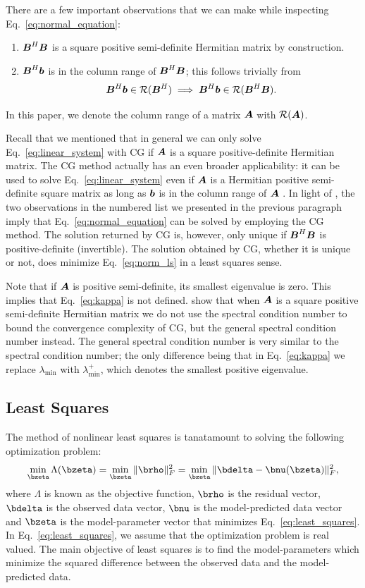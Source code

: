 \documentclass[useAMS,usenatbib]{mn2e}
\newcommand{\bA}{\bmath{A}}
\newcommand{\bB}{\bmath{B}}
\newcommand{\bb}{\bmath{b}}
\begin{document}
There are a few important observations that we can make while inspecting Eq.~\eqref{eq:normal_equation}:
\begin{enumerate}
\item $\bB^H\bB$ is a square positive semi-definite Hermitian matrix by construction.
\item $\bB^H\bb$ is in the column range of $\bB^H\bB$; this follows trivially from 
\begin{equation}
\bB^H\bb \in \mathcal{R}(\bB^H) \implies \bB^H\bb \in \mathcal{R}(\bB^H\bB).   
\end{equation}
\end{enumerate}
In this paper, we denote the column range of a matrix $\bA$ with $\mathcal{R}(\bA)$.

Recall that we mentioned that in general we can only solve Eq.~\eqref{eq:linear_system} with CG if $\bA$ is a square positive-definite Hermitian matrix. The CG method actually has an even broader applicability: it can be used to solve Eq.~\eqref{eq:linear_system} even if $\bA$ is a Hermitian positive semi-definite
square matrix as long as $\bb$ is in the column range of $\bA$ \citep{Lu2015}. In light of \citet{Lu2015}, the two observations in the numbered list we presented in the previous paragraph imply that Eq.~\eqref{eq:normal_equation}
can be solved by employing the CG method. The solution returned by CG is, however, only unique if $\bB^H\bB$ is positive-definite (invertible). The solution
obtained by CG, whether it is unique or not, does minimize Eq.~\eqref{eq:norm_ls} in a least squares sense.

Note that if $\bA$ is positive semi-definite, its smallest eigenvalue is zero. This implies that Eq.~\eqref{eq:kappa} is not defined. \citet{Lu2015} show that when $\bA$
is a square positive semi-definite Hermitian matrix we do not use the spectral condition number to bound the convergence complexity of CG, but the general spectral condition
number instead. The general spectral condition number is very similar to the spectral condition number; the only difference being that in Eq.~\eqref{eq:kappa} we replace  
$\lambda_{\textrm{min}}$ with $\lambda_{\textrm{min}}^+$, which denotes the smallest positive eigenvalue. 

\subsection{Least Squares}
\label{sec:ls}
The method of nonlinear least squares is tanatamount to solving the following optimization problem:  
\begin{equation}
\label{eq:least_squares}
\min_{\bzeta} \Lambda(\bzeta) = \min_{\bzeta} \|\brho\|_F^2 = \min_{\bzeta} \|\bdelta - \bnu(\bzeta)\|_F^2, 
\end{equation}
where $\Lambda$ is known as the objective function, $\brho$ is the residual vector, $\bdelta$ is the observed data vector, $\bnu$ is the model-predicted data vector and $\bzeta$ is the model-parameter vector that minimizes Eq.~\eqref{eq:least_squares}.
In Eq.~\eqref{eq:least_squares}, we assume that the optimization problem is real valued.
The main objective of least squares is to find the model-parameters which minimize the squared difference between the observed data and the model-predicted data.
\end{document}
